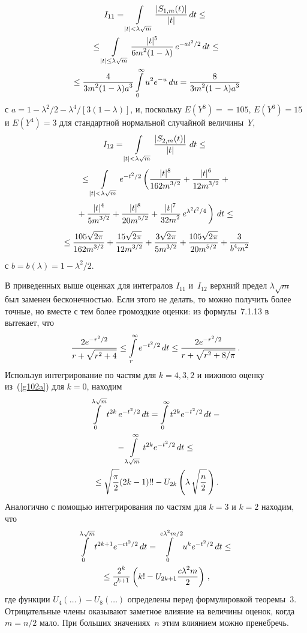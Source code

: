\begin{multicols}{2}
\noindent
\begin{multline*}
I_{11}  =  \int\limits_{|t|<\lambda\sqrt{m}} \displaystyle\frac{\displaystyle |S_{1,m}(t)|\mathstrut}{\displaystyle |t|\mathstrut} \,dt \leq{}\\
{}\leq \int\limits_{|t| \leq \lambda\sqrt{m}} \displaystyle\frac{\displaystyle |t|^5\mathstrut}{\displaystyle 6m^2(1-\lambda)\mathstrut} \,e^{-at^2/2}\,dt \leq{}\\
{}\leq  \displaystyle\frac{\displaystyle 4\mathstrut}{\displaystyle 3m^2(1-\lambda)a^3\mathstrut}\int\limits_0^\infty u^2e^{-u}\,du
= \displaystyle\frac{\displaystyle 8\mathstrut}{\displaystyle 3m^2(1-\lambda)a^3\mathstrut} 
\end{multline*}
с  $a=1 -  \lambda^2/2 -   \lambda^4/[3(1-\lambda)]$,
и, поскольку $E(Y^8)=$\linebreak $=105$, $E(Y^6)=15$ и $E(Y^4)=3$ для стандартной нормальной случайной величины~$Y$,
\begin{multline*} %
I_{12}  =  \int\limits_{|t|<\lambda\sqrt{m}} \fr{|S_{2,m}(t)|}{|t|} \,\,dt\leq{}\\[3pt]
{} \leq \int\limits_{|t| < \lambda\sqrt{m}} e^{-t^2/2}\left(
\fr{|t|^8}{162m^{3/2}}+\fr{|t|^6}{12m^{3/2}}+{}\right. \\[3pt]
\left.{}+\fr{ |t|^4}{5m^{3/2}}+\fr{ |t|^8}{20m^{5/2}}+\fr{|t|^7}{32m^2}\, e^{\lambda^2 t^2 /4}\,\right)\,dt \leq{}\\[3pt]
{}\leq \fr{105 \sqrt{2\pi}}{162m^{3/2}}+\fr{15\sqrt{2\pi}}{12m^{3/2}} +
\fr{3\sqrt{2\pi}}{5m^{3/2}} +\fr{105\sqrt{2\pi}}{20m^{5/2} }+
\fr{3}{b^4 m^2}
\end{multline*}
с $b=b(\lambda)=1- \lambda^2/2$.


В приведенных выше оценках для интегралов   $I_{11}$ и~$I_{12}$ верхний предел $\lambda\sqrt{m}$ 
был заменен бесконечностью. Если этого не делать, то можно получить более точные, но вместе с тем 
более громоздкие оценки:
из формулы~7.1.13 в~\cite{8-cr}   вытекает, что
\begin{equation}
\displaystyle\frac{\displaystyle 2e^{-r^2/2}\mathstrut}{\displaystyle r + \sqrt{r^2 + 4}\mathstrut} \leq \int\limits_r^{\infty} e^{-t^2/2}\,dt \leq 
\displaystyle\frac{\displaystyle 2 e^{-r^2/2}\mathstrut}{\displaystyle r + \sqrt{r^2 + 8/\pi}\mathstrut}\,.
\label{g102a}
\end{equation}
Используя интегрирование по частям для   $k=4, 3, 2$  и нижнюю оценку из~(\ref{g102a}) для $k=0$, находим
\begin{multline*}
  \int\limits_0^{\lambda\sqrt{m}}t^{2k}\,e^{-t^2/2}\,dt =\int\limits_0^{\infty}t^{2k}e^{-t^2/2}\,dt - {}\\
  {}-
  \int\limits_{\lambda\sqrt{m}}^{\infty}t^{2k}e^{-t^2/2}\,dt \leq{}\\
{}\leq  \sqrt{\displaystyle\frac{\displaystyle \pi\mathstrut}{\displaystyle 2\mathstrut}}(2k-1)!!-U_{2k}\left(\lambda\,\sqrt{\displaystyle\frac{\displaystyle n\mathstrut}{\displaystyle 2\mathstrut}}\,\right).
\end{multline*}
Аналогично с помощью интегрирования по частям для   $k=3$  и $k=2$ находим, что
\begin{multline*}
\int\limits_0^{\lambda\sqrt{m}} t^{2k+1}e^{-ct^2/2}\,dt =
\int\limits_0^{c\lambda^2 m/2}u^k e^{-t^2/2}\,dt\leq{}\\
{}\leq\displaystyle\frac{\displaystyle 2^k\mathstrut}{\displaystyle c^{k+1}\mathstrut}\left(k! - U_{2k+1}\displaystyle\frac{\displaystyle c\lambda^2m\mathstrut}{\displaystyle 2\mathstrut}\right)\,,
\end{multline*}
где функции   $U_4(\ldots)- U_8(\ldots)$ 
определены перед формулировкой теоремы~3. Отрицательные члены оказывают заметное влияние на величины 
оценок, когда   $m = n/2 $ мало. При больших значениях~$n$ этим влиянием можно пренебречь.  


\end{multicols}
